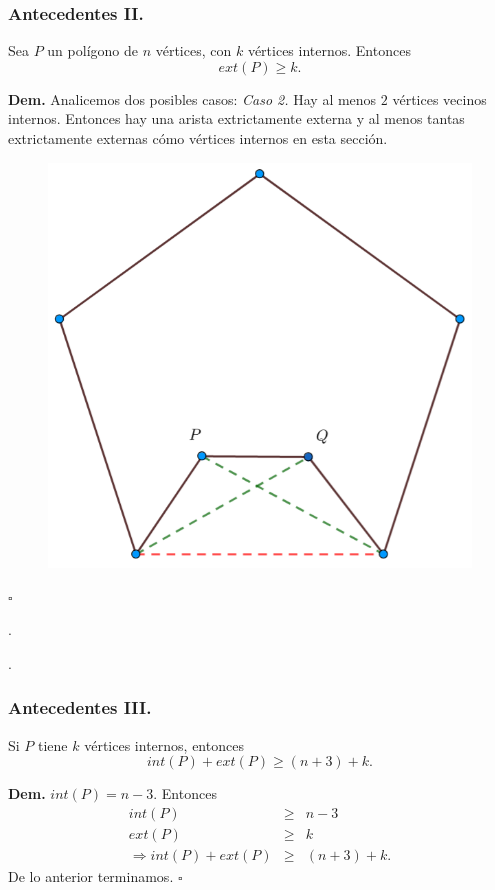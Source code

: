 \begin{frame}
  \frametitle{Antecedentes II.}    
  \begin{lema}
    Sea $P$ un polígono de $n$ vértices, con $k$ vértices internos. Entonces \[ext(P) \geq k.\]
  \end{lema}
  \textbf{Dem.} Analicemos dos posibles casos:\newline
  \textit{Caso 2.} Hay al menos $2$ vértices vecinos internos. Entonces hay una arista extrictamente externa
  y al menos tantas extrictamente externas cómo vértices internos en esta sección.
  \begin{figure}
    \centering
    \includegraphics[width=.15 \paperwidth]{./images/Caso02.png}
  \end{figure}
  \hfill $\square$\newline
  
  .\newline

  .
\end{frame}

\begin{frame}
  \frametitle{Antecedentes III.}    
  \begin{lema}
    Si $P$ tiene $k$ vértices internos, entonces \[int(P) + ext(P) \geq (n + 3) + k.\]
  \end{lema}
  \textbf{Dem.} $int(P) = n - 3$. Entonces
  \begin{eqnarray*}
    int(P) &\geq& n - 3\\
    ext(P) &\geq& k\\
    \Rightarrow int(P) + ext(P) &\geq& (n + 3) + k.
  \end{eqnarray*}
  De lo anterior terminamos. \hfill $\square$
\end{frame}


